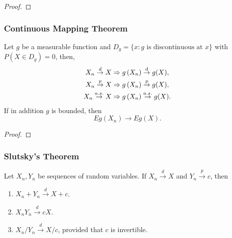 \begin{proof}

\end{proof}

\subsubsection{Continuous Mapping Theorem}

\begin{theorem}\label{thm:continuous-mapping-theorem}
	Let \(g\) be a measurable function and \(D_g=\{x:g \text{ is discontinuous at } x\}\) with \(P(X\in D_g)=0\), then,
	\begin{equation}
		\begin{aligned}
			X_{n} \stackrel{d}{\rightarrow} X    & \Rightarrow g\left(X_{n}\right) \stackrel{\mathop{}\!\mathrm{d}}{\rightarrow} g(X), \\
			X_{n} \stackrel{p}{\rightarrow} X    & \Rightarrow g\left(X_{n}\right) \stackrel{p}{\rightarrow} g(X),    \\
			X_{n} \stackrel{a.s.}{\rightarrow} X & \Rightarrow g\left(X_{n}\right) \stackrel{a.s.}{\rightarrow} g(X). \\
		\end{aligned}
	\end{equation}
	If in addition \(g\) is bounded, then
	\begin{equation}
		Eg(X_n)\rightarrow Eg(X).
	\end{equation}
\end{theorem}

\begin{proof}

\end{proof}

\subsubsection{Slutsky's Theorem}

\begin{theorem}\label{thm:slutsky-theorem}
	Let \(X_{n}, Y_{n}\) be sequences of random variables. If \(X_{n}\stackrel{d}{\rightarrow}X\) and \(Y_{n}\stackrel{p}{\rightarrow}c\), then
	\begin{enumerate}
		\item \(X_{n}+Y_{n}\stackrel{d}{\rightarrow}X+c\).
		\item \(X_{n}Y_{n}\stackrel{d}{\rightarrow}cX\).
		\item \(X_{n}/Y_{n}\stackrel{d}{\rightarrow}X/c\), provided that \(c\) is invertible.
	\end{enumerate}
\end{theorem}

